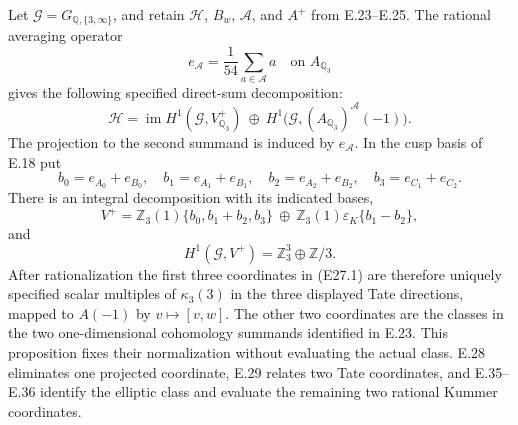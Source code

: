 \begin{proposition}
\label{E-explicit-kernel}
Let $\mathcal G=G_{\mathbb Q,\{3,\infty\}}$, and retain
$\mathcal H$, $B_w$, $\mathcal A$, and $A^+$ from E.23--E.25.
The rational averaging operator
\[
 e_{\mathcal A}=\frac1{54}\sum_{a\in\mathcal A}a
       \quad\text{on }A_{\mathbb Q_3}
\]
gives the following specified direct-sum decomposition:
\[
 \mathcal H=
 \operatorname{im}H^1(\mathcal G,V^+_{\mathbb Q_3})
 \ \oplus\
 H^1\bigl(\mathcal G,(A_{\mathbb Q_3})^{\mathcal A}(-1)\bigr).
 \tag{E27.1}
\]
The projection to the second summand is induced by
$e_{\mathcal A}$. In the cusp basis of E.18 put
\[
 b_0=e_{A_0}+e_{B_0},\quad
 b_1=e_{A_1}+e_{B_1},\quad
 b_2=e_{A_2}+e_{B_2},\quad
 b_3=e_{C_1}+e_{C_2}.
\]
There is an integral decomposition with its indicated bases,
\[
 V^+=
 \mathbb Z_3(1)\{b_0,b_1+b_2,b_3\}
 \ \oplus\
 \mathbb Z_3(1)\varepsilon_K\{b_1-b_2\},
 \tag{E27.2}
\]
and
\[
 H^1(\mathcal G,V^+)=\mathbb Z_3^3\oplus\mathbb Z/3.
 \tag{E27.3}
\]
After rationalization the first three coordinates in
(E27.1) are therefore uniquely specified scalar multiples
of $\kappa_3(3)$ in the three displayed Tate directions,
mapped to $A(-1)$ by $v\mapsto[v,w]$.
The other two coordinates are the classes in the two
one-dimensional cohomology summands identified in E.23.
This proposition fixes their normalization without
evaluating the actual class. E.28 eliminates one
projected coordinate, E.29 relates two Tate coordinates,
and E.35--E.36 identify the elliptic class and evaluate
the remaining two rational Kummer coordinates.
\end{proposition}
